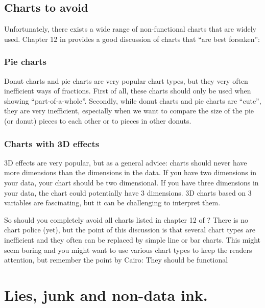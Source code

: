 \documentclass[]{book}
\begin{document}
\hypertarget{charts-to-avoid}{%
\subsection{Charts to avoid}\label{charts-to-avoid}}

Unfortunately, there exists a wide range of non-functional charts that are widely used. Chapter 12 in \citep{few2012show} provides a good discussion of charts that ``are best forsaken'':

\hypertarget{pie-charts}{%
\subsubsection{Pie charts}\label{pie-charts}}

Donut charts and pie charts are very popular chart types, but they very often inefficient ways of fractions. First of all, these charts should only be used when showing ``part-of-a-whole''. Secondly, while donut charts and pie charts are ``cute'', they are very inefficient, especially when we want to compare the size of the pie (or donut) pieces to each other or to pieces in other donuts.

\hypertarget{charts-with-3d-effects}{%
\subsubsection{Charts with 3D effects}\label{charts-with-3d-effects}}

3D effects are very popular, but as a general advice: charts should never have more dimensions than the dimensions in the data. If you have two dimensions in your data, your chart should be two dimensional. If you have three dimensions in your data, the chart could potentially have 3 dimensions. 3D charts based on 3 variables are fascinating, but it can be challenging to interpret them.

So should you completely avoid all charts listed in chapter 12 of \citep{few2012show} ? There is no chart police (yet), but the point of this discussion is that several chart types are inefficient and they often can be replaced by simple line or bar charts. This might seem boring and you might want to use various chart types to keep the readers attention, but remember the point by Cairo: They should be functional

\hypertarget{lies-junk-and-non-data-ink.}{%
\section{Lies, junk and non-data ink.}\label{lies-junk-and-non-data-ink.}}
\end{document}
